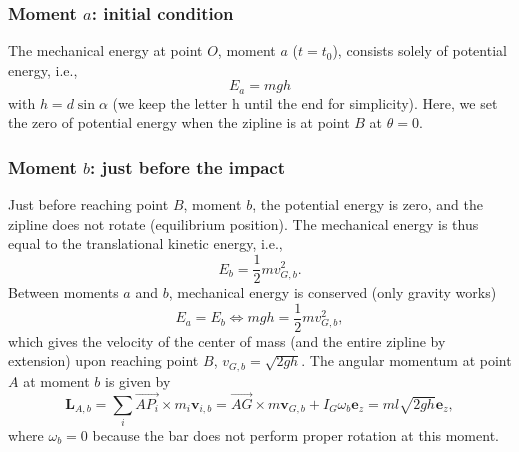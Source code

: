 \documentclass[11pt,a4paper]{exam}
\newcommand{\ezACDH}{\bm e_z}
\begin{document}
\begin{parts}
    \subsubsection*{Moment $a$: initial condition}
    The mechanical energy at point $O$, moment $a$ ($t=t_0$), consists solely of potential energy, i.e.,
    \begin{equation}
        E_{a} =mgh
    \end{equation}
    with $h=d\sin\alpha$ (we keep the letter h until the end for simplicity). 
    Here, we set the zero of potential energy when the zipline is at point $B$ at $\theta=0$.
    
    \subsubsection*{Moment $b$: just before the impact}
    Just before reaching point $B$, moment $b$, the potential energy is zero, and the zipline does not rotate (equilibrium position).
    The mechanical energy is thus equal to the translational kinetic energy, i.e.,
    \begin{equation}
        E_{b} = \frac{1}{2}mv_{G,b}^2.
    \end{equation}
    Between moments $a$ and $b$, mechanical energy is conserved (only gravity works)
    \begin{equation}
        E_{a} = E_{b} \Leftrightarrow mgh = \frac{1}{2}mv_{G,b}^2,
    \end{equation}
    which gives the velocity of the center of mass (and the entire zipline by extension) upon reaching point $B$, $v_{G,b}=\sqrt{2gh}$.
    The angular momentum at point $A$ at moment $b$ is given by 
    \begin{equation}
        \bm L_{A,b} =\sum_i\overrightarrow{AP_i}\times m_i \bm v_{i,b} = \overrightarrow{AG}\times m \bm v_{G,b} + I_G \omega_b \ezACDH = ml\sqrt{2gh}\ezACDH,
    \end{equation}
    where $\omega_b=0$ because the bar does not perform proper rotation at this moment.
    

\end{parts}
\end{document}
